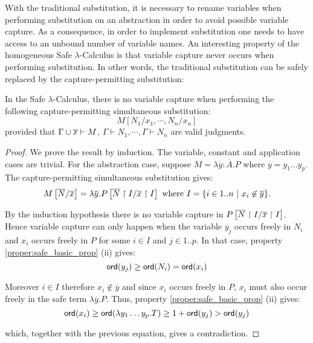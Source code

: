 With the traditional substitution, it is necessary to rename
variables when performing substitution on an abstraction in order to
avoid possible variable capture. As a consequence, in order to
implement substitution one needs to have access to an unbound number
of variable names. An interesting property of the homogeneous Safe
$\lambda$-Calculus is that variable capture never occurs when
performing substitution. In other words, the traditional
substitution can be safely replaced by the capture-permitting
substitution:

\begin{lem}
\label{lem:homog_nocapture} In the Safe $\lambda$-Calculus, there is
no variable capture when performing the following capture-permitting
simultaneous substitution:
$$ M[N_1 / x_1 , \cdots, N_n / x_n] $$
provided that $\Gamma \cup \overline{x} \vdash M$, $\Gamma \vdash  N_1, \cdots ,\Gamma \vdash  N_n$ are valid judgments.
\end{lem}

\begin{proof}
We prove the result by induction. The variable, constant and
application cases are trivial. For the abstraction case, suppose $M
= \lambda \overline{y} : \overline{A}. P$ where $\overline{y} = y_1
\ldots y_p$. The capture-permitting simultaneous substitution gives:
$$M \left[ \overline{N}/\overline{x} \right] = \lambda \overline{y} . P
\left[ \overline{N} \upharpoonright I/\overline{x} \upharpoonright
I \right] \mbox{ where } I  = \{ i \in 1..n \ | \ x_i \not \in \overline{y}
\}. $$


By the induction hypothesis there is no variable capture in $P
\left[ \overline{N} \upharpoonright I/\overline{x} \upharpoonright
I \right]$. Hence variable capture can only happen when the variable $y_j$
occurs freely in $N_i$ and $x_i$ occurs freely in $P$ for some $i
\in I$ and $j \in 1..p$. In that case, property
\ref{proper:safe_basic_prop} (ii) gives:
$$ {\sf ord}(y_j) \geq {\sf ord}(N_i) = {\sf ord}(x_i)$$

Moreover $i\in I$ therefore $x_i \not \in \overline{y}$ and since $x_i$ occurs freely in $P$, $x_i$ must also occur freely in the safe term
$\lambda \overline{y}. P$. Thus, property \ref{proper:safe_basic_prop} (ii) gives:
$$ {\sf ord}(x_i) \geq {\sf ord}(\lambda y_1 \ldots y_p . T) \geq 1+ {\sf ord}(y_j) > {\sf ord}(y_j)$$

which, together with the previous equation, gives a contradiction.
\end{proof}




